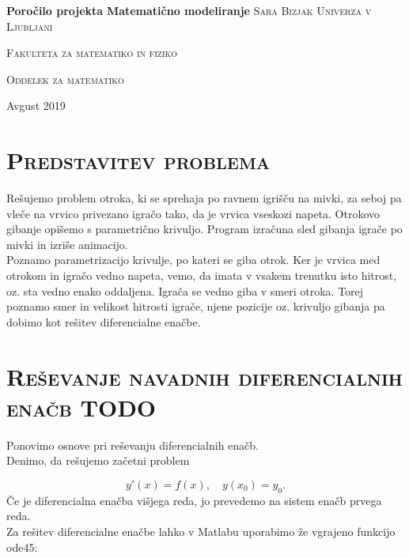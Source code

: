 \documentclass[a4paper,12pt]{article}
\begin{document}

\begin{titlepage}
    \centering
    \vfill
    \vfill
    \textbf{\Huge{Poročilo projekta}}
    \vfill
    \textbf{\LARGE{Matematično modeliranje}}
    \vfill\vfill\vfill\vfill\vfill
    \textsc{\Large{Sara Bizjak}}
    \vfill\vfill
    \textsc{\large{Univerza v Ljubljani}}
    
    \textsc{\large{Fakulteta za matematiko in fiziko}}
    
    \textsc{\large{Oddelek za matematiko}}
    \vfill\vfill
        
    \large{Avgust 2019}
    
    \end{titlepage}

\newpage

\tableofcontents

\newpage

\section{\textsc{\large{Predstavitev problema}}}


Rešujemo problem otroka, ki se sprehaja po ravnem igrišču na mivki, za seboj pa vleče na 
vrvico privezano igračo tako, da je vrvica vseskozi napeta. Otrokovo gibanje opišemo s 
parametrično krivuljo. Program izračuna sled gibanja igrače po mivki in izriše animacijo.
\\
Poznamo parametrizacijo krivulje, po kateri se giba otrok. Ker je vrvica med otrokom in 
igračo vedno napeta, vemo, da imata v vsakem trenutku isto hitrost, oz. sta vedno enako 
oddaljena. Igrača se vedno giba v smeri otroka. 
Torej poznamo smer in velikost hitrosti igrače, njene pozicije oz. krivuljo gibanja pa 
dobimo kot rešitev diferencialne enačbe.

\section{\textsc{\large{Reševanje navadnih diferencialnih enačb TODO}}}

Ponovimo osnove pri reševanju diferencialnih enačb. \\
Denimo, da rešujemo začetni problem 

\begin{displaymath}
y'(x) = f(x), \quad y(x_{0}) = y_{0}.
\end{displaymath}
Če je diferencialna enačba višjega reda, jo prevedemo na sistem enačb prvega reda. \\
Za rešitev diferencialne enačbe lahko v Matlabu uporabimo že vgrajeno funkcijo 
ode45:
\end{document}
